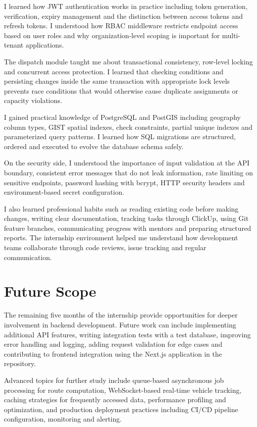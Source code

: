 \documentclass[12pt,a4paper]{report}
\begin{document}
I learned how JWT authentication works in practice including token generation, verification, expiry management and the distinction between access tokens and refresh tokens. I understood how RBAC middleware restricts endpoint access based on user roles and why organization-level scoping is important for multi-tenant applications.

The dispatch module taught me about transactional consistency, row-level locking and concurrent access protection. I learned that checking conditions and persisting changes inside the same transaction with appropriate lock levels prevents race conditions that would otherwise cause duplicate assignments or capacity violations.

I gained practical knowledge of PostgreSQL and PostGIS including geography column types, GIST spatial indexes, check constraints, partial unique indexes and parameterized query patterns. I learned how SQL migrations are structured, ordered and executed to evolve the database schema safely.

On the security side, I understood the importance of input validation at the API boundary, consistent error messages that do not leak information, rate limiting on sensitive endpoints, password hashing with bcrypt, HTTP security headers and environment-based secret configuration.

I also learned professional habits such as reading existing code before making changes, writing clear documentation, tracking tasks through ClickUp, using Git feature branches, communicating progress with mentors and preparing structured reports. The internship environment helped me understand how development teams collaborate through code reviews, issue tracking and regular communication.

\section{Future Scope}
The remaining five months of the internship provide opportunities for deeper involvement in backend development. Future work can include implementing additional API features, writing integration tests with a test database, improving error handling and logging, adding request validation for edge cases and contributing to frontend integration using the Next.js application in the repository.

Advanced topics for further study include queue-based asynchronous job processing for route computation, WebSocket-based real-time vehicle tracking, caching strategies for frequently accessed data, performance profiling and optimization, and production deployment practices including CI/CD pipeline configuration, monitoring and alerting.
\end{document}
